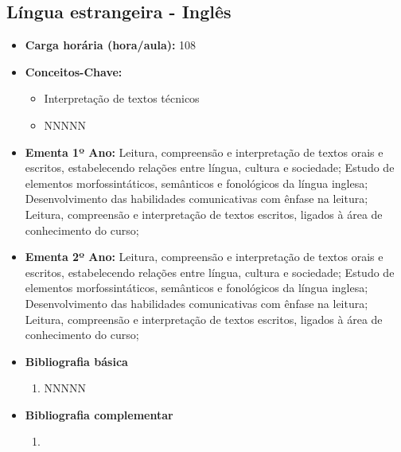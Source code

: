 \documentclass[11pt,fleqn]{book} %
\begin{document}
\subsection{Língua estrangeira - Inglês}\label{disc:ingles}
\begin{itemize}
	\item \textbf{Carga horária (hora/aula):} 108

	\item \textbf{Conceitos-Chave:}
	\begin{itemize}
		\item Interpretação de textos técnicos
		\item NNNNN
	\end{itemize}
	\item \textbf{Ementa 1º Ano:} 
	Leitura, compreensão e interpretação de textos orais e escritos, estabelecendo relações entre língua, cultura e sociedade;
	Estudo de elementos morfossintáticos, semânticos e fonológicos da língua inglesa;
	Desenvolvimento das habilidades comunicativas com ênfase na leitura;
	Leitura, compreensão e interpretação de textos escritos, ligados à área de conhecimento do curso;
	\item \textbf{Ementa 2º Ano:} 
	Leitura, compreensão e interpretação de textos orais e escritos, estabelecendo relações entre língua, cultura e sociedade;
	Estudo de elementos morfossintáticos, semânticos e fonológicos da língua inglesa;
	Desenvolvimento das habilidades comunicativas com ênfase na leitura;
	Leitura, compreensão e interpretação de textos escritos, ligados à área de conhecimento do curso;	
	\item \textbf{Bibliografia básica}
	\begin{enumerate}
		\item NNNNN
	\end{enumerate}
	\item \textbf{Bibliografia complementar}
	\begin{enumerate}
		\item 
	\end{enumerate}	
\end{itemize}

\newpage
\end{document}

